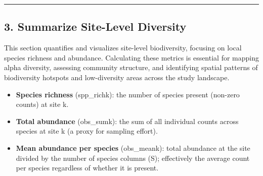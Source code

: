 \documentclass[
]{article}
\providecommand{\tightlist}{%
  \setlength{\itemsep}{0pt}\setlength{\parskip}{0pt}}
\begin{document}
\begin{center}\rule{0.5\linewidth}{0.5pt}\end{center}

\hypertarget{summarize-site-level-diversity}{%
\subsection{3. Summarize Site-Level
Diversity}\label{summarize-site-level-diversity}}

This section quantifies and visualizes site-level biodiversity, focusing
on local species richness and abundance. Calculating these metrics is
essential for mapping alpha diversity, assessing community structure,
and identifying spatial patterns of biodiversity hotspots and
low-diversity areas across the study landscape.

\begin{itemize}
\tightlist
\item
  \textbf{Species richness} (spp\_richk): the number of species present
  (non-zero counts) at site k.
\item
  \textbf{Total abundance} (obs\_sumk): the sum of all individual counts
  across species at site k (a proxy for sampling effort).
\item
  \textbf{Mean abundance per species} (obs\_meank): total abundance at
  the site divided by the number of species columns (S); effectively the
  average count per species regardless of whether it is present.
\end{itemize}
\end{document}
